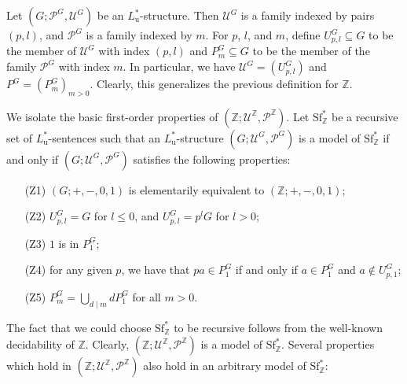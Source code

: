\documentclass[letterpaper]{amsart}
\newcommand{\zz}{\mathbb{Z}}
\newcommand{\sU}{\mathscr{U}}
\newcommand{\sP}{\mathscr{P}}
\newcommand{\WSFZ}{\mathrm{Sf}^*_{\zz}}
\begin{document}
\medskip \noindent
Let $(G; \sP^G, \sU^G)$ be an $L_\mathrm{u}^*$-structure. Then $\sU^G$ is a family indexed by pairs $(p, l)$, and $\sP^{G}$ is a family indexed by $m$. For $p$, $l$, and $m$, define $U^G_{p, l} \subseteq G$ to be  the member of $\sU^G$ with index $(p, l)$  and $P^G_m \subseteq G$ to be the member of the family $\sP^G$ with index $m$. In particular, we have
$\sU^G = (U^G_{p, l})$  and  $P^G = (P^G_m)_{m>0}$.
Clearly, this generalizes the previous definition for $\zz$.

\medskip \noindent We isolate the basic first-order properties of $(\zz; \sU^\zz, \sP^\zz)$. 
Let $\WSFZ$ be a recursive set of $L_\mathrm{u}^*$-sentences such that an $L_\mathrm{u}^*$-structure $(G; \sU^G, \sP^G)$ is a model of $\WSFZ$ if and only if $(G; \sU^G, \sP^G)$   satisfies the following properties:
\begin{enumerate}
\item[(Z1)] $(G;+,-,0,1)$ is elementarily equivalent to $(\zz;+,-,0,1)$; 
\item[(Z2)] $U^G_{p,l}= G$ for $l\leq 0$,  and $U^G_{p,l}= p^lG$ for $l>0$;
\item[(Z3)] $1$ is in $P^G_1$;
\item[(Z4)] for any given $p$, we have that $pa \in P^G_1$ if and only if $a\in P^G_1$ and $a \notin U^G_{p,1}$;
\item[(Z5)] $P^G_m =\bigcup_{d \mid m} dP^G_1 $ for all $m>0$.
\end{enumerate}
\noindent The fact that we could choose $\WSFZ$ to be recursive follows from the well-known decidability of $\zz$. Clearly, $(\zz; \sU^\zz, \sP^\zz)$ is a  model of $\WSFZ$. Several properties which hold in $(\zz; \sU^\zz, \sP^\zz)$ also hold in an arbitrary model of $\WSFZ$:
\end{document}
